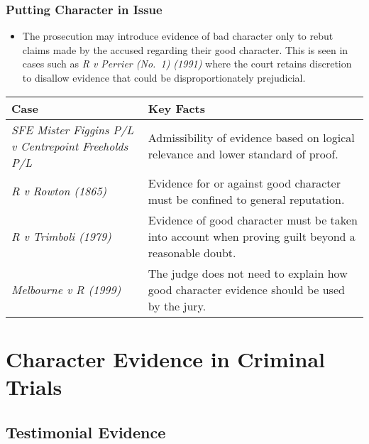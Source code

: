 \subsubsection{Putting Character in
Issue}\label{putting-character-in-issue}

\begin{itemize}
\tightlist
\item
  The prosecution may introduce evidence of bad character only to rebut
  claims made by the accused regarding their good character. This is
  seen in cases such as \emph{R v Perrier (No.~1) (1991)} where the
  court retains discretion to disallow evidence that could be
  disproportionately prejudicial.
\end{itemize}

\begin{longtable}[]{@{}
  >{\raggedright\arraybackslash}p{}
  >{\raggedright\arraybackslash}p{}@{}}
\toprule\noalign{}
\begin{minipage}[b]{\linewidth}\raggedright
\textbf{Case}
\end{minipage} & \begin{minipage}[b]{\linewidth}\raggedright
\textbf{Key Facts}
\end{minipage} \\
\midrule\noalign{}
\endhead
\bottomrule\noalign{}
\endlastfoot
\emph{SFE Mister Figgins P/L v Centrepoint Freeholds P/L} &
Admissibility of evidence based on logical relevance and lower standard
of proof. \\
\emph{R v Rowton (1865)} & Evidence for or against good character must
be confined to general reputation. \\
\emph{R v Trimboli (1979)} & Evidence of good character must be taken
into account when proving guilt beyond a reasonable doubt. \\
\emph{Melbourne v R (1999)} & The judge does not need to explain how
good character evidence should be used by the jury. \\
\end{longtable}

\section{  Character Evidence in Criminal
Trials}\label{character-evidence-in-criminal-trials}

\subsection{Testimonial Evidence}\label{testimonial-evidence}

